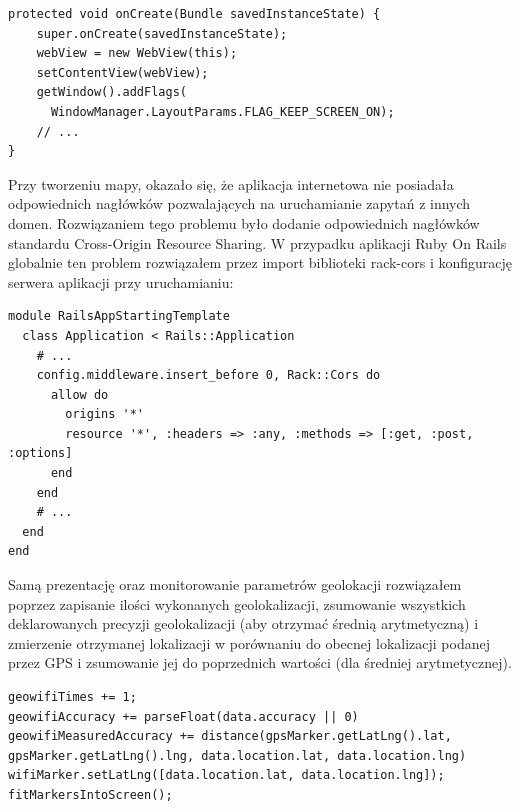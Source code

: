 \begin{verbatim}
protected void onCreate(Bundle savedInstanceState) {
    super.onCreate(savedInstanceState);
    webView = new WebView(this);
    setContentView(webView);
    getWindow().addFlags(
      WindowManager.LayoutParams.FLAG_KEEP_SCREEN_ON);
    // ...
}
\end{verbatim}

Przy tworzeniu mapy, okazało się, że aplikacja internetowa nie posiadała odpowiednich nagłówków pozwalających na uruchamianie zapytań z innych domen. Rozwiązaniem tego problemu było dodanie odpowiednich nagłówków standardu Cross-Origin Resource Sharing. W przypadku aplikacji Ruby On Rails globalnie ten problem rozwiązałem przez import biblioteki rack-cors i konfigurację serwera aplikacji przy uruchamianiu:

\begin{verbatim}
module RailsAppStartingTemplate
  class Application < Rails::Application
    # ...
    config.middleware.insert_before 0, Rack::Cors do
      allow do
        origins '*'
        resource '*', :headers => :any, :methods => [:get, :post, :options]
      end
    end
    # ...
  end
end
\end{verbatim}

Samą prezentację oraz monitorowanie parametrów geolokacji rozwiązałem poprzez zapisanie ilości wykonanych geolokalizacji, zsumowanie wszystkich deklarowanych precyzji geolokalizacji (aby otrzymać średnią arytmetyczną) i zmierzenie otrzymanej lokalizacji w porównaniu do obecnej lokalizacji podanej przez GPS i zsumowanie jej do poprzednich wartości (dla średniej arytmetycznej).

\begin{verbatim}
geowifiTimes += 1;
geowifiAccuracy += parseFloat(data.accuracy || 0)
geowifiMeasuredAccuracy += distance(gpsMarker.getLatLng().lat, gpsMarker.getLatLng().lng, data.location.lat, data.location.lng)
wifiMarker.setLatLng([data.location.lat, data.location.lng]);
fitMarkersIntoScreen();
\end{verbatim}


